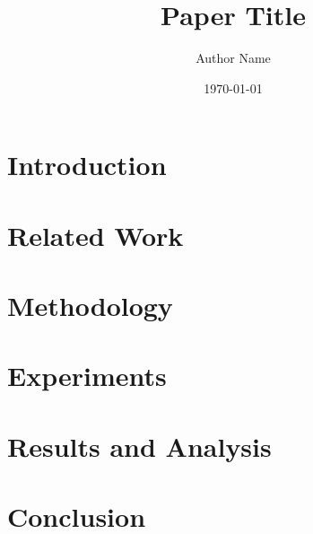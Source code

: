 \documentclass[12pt]{article}
\begin{document}
\title{Paper Title}
\author{Author Name}
\date{\today}
\maketitle

\begin{abstract}

\end{abstract}

\section{Introduction}
\label{sec:introduction}


\section{Related Work}
\label{sec:related_work}


\section{Methodology}
\label{sec:methodology}


\section{Experiments}
\label{sec:experiments}


\section{Results and Analysis}
\label{sec:results}


\section{Conclusion}
\label{sec:conclusion}




\end{document}
